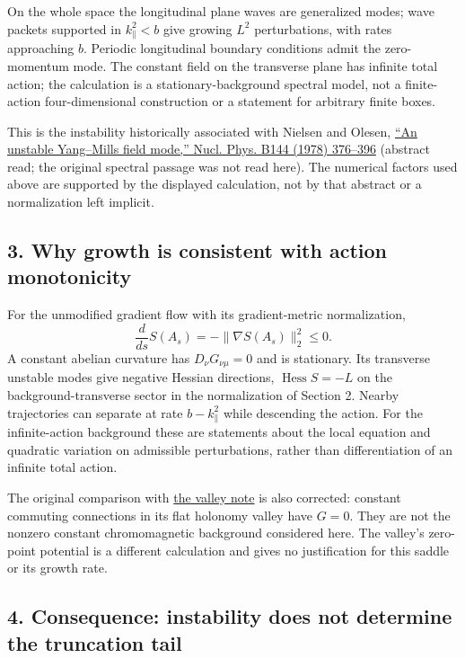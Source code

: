 \documentclass[11pt,a4paper]{article}
\begin{document}
On the whole space the longitudinal plane waves are generalized modes;
wave packets supported in \(k_\parallel^2<b\) give growing \(L^2\)
perturbations, with rates approaching \(b\). Periodic longitudinal
boundary conditions admit the zero-momentum mode. The constant field on
the transverse plane has infinite total action; the calculation is a
stationary-background spectral model, not a finite-action
four-dimensional construction or a statement for arbitrary finite boxes.

This is the instability historically associated with Nielsen and Olesen,
\href{https://doi.org/10.1016/0550-3213(78)90377-2}{``An unstable
Yang--Mills field mode,'' Nucl. Phys. B144 (1978) 376--396} (abstract
read; the original spectral passage was not read here). The numerical
factors used above are supported by the displayed calculation, not by
that abstract or a normalization left implicit.

\subsection{3. Why growth is consistent with action
monotonicity}\label{why-growth-is-consistent-with-action-monotonicity}

For the unmodified gradient flow with its gradient-metric normalization,
\[\frac{d}{ds}S(A_s)=-\|\nabla S(A_s)\|_2^2\le0.\] A constant abelian
curvature has \(D_\nu G_{\nu\mu}=0\) and is stationary. Its transverse
unstable modes give negative Hessian directions,
\(\operatorname{Hess}S=-L\) on the background-transverse sector in the
normalization of Section 2. Nearby trajectories can separate at rate
\(b-k_\parallel^2\) while descending the action. For the infinite-action
background these are statements about the local equation and quadratic
variation on admissible perturbations, rather than differentiation of an
infinite total action.

The original comparison with \href{torus-valley-potential.md}{the valley
note} is also corrected: constant commuting connections in its flat
holonomy valley have \(G=0\). They are not the nonzero constant
chromomagnetic background considered here. The valley's zero-point
potential is a different calculation and gives no justification for this
saddle or its growth rate.

\subsection{4. Consequence: instability does not determine the
truncation
tail}\label{consequence-instability-does-not-determine-the-truncation-tail}
\end{document}
